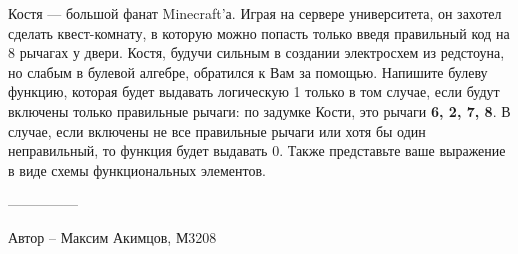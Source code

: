 \question
Костя — большой фанат Minecraft’а. Играя на сервере университета, он захотел сделать квест-комнату, в которую можно попасть только введя правильный код на 8 рычагах у двери. Костя, будучи сильным в создании электросхем из редстоуна, но слабым в булевой алгебре, обратился к Вам за помощью. Напишите булеву функцию, которая будет выдавать логическую 1 только в том случае, если будут включены только правильные рычаги: по задумке Кости, это рычаги \textbf{6, 2, 7, 8}. В случае, если включены не все правильные рычаги или хотя бы один неправильный, то функция будет выдавать 0. Также представьте ваше выражение в виде схемы функциональных элементов.

---------------

Автор -- Максим Акимцов, М3208